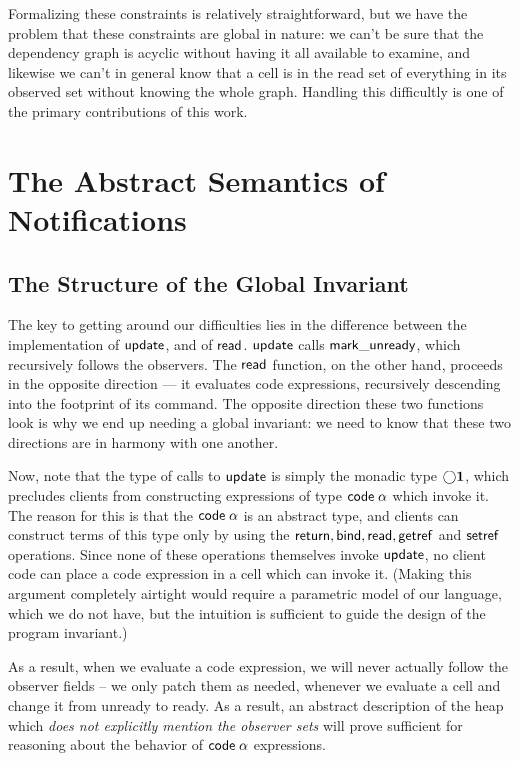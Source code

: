 Formalizing these constraints is relatively straightforward, but we
have the problem that these constraints are global in nature:
we can't be sure that the dependency graph is acyclic without having
it all available to examine, and likewise we can't in general know
that a cell is in the read set of everything in its observed set
without knowing the whole graph. Handling this difficultly is one of
the primary contributions of this work. 

\section{The Abstract Semantics of Notifications}

\subsection{The Structure of the Global Invariant}

The key to getting around our difficulties lies in the difference
between the implementation of $\mathsf{update}$, and of $\mathsf{read}$.
$\mathsf{update}$ calls $\mathsf{mark\_unready}$, which recursively follows
the observers. The $\mathsf{read}$ function, on the other hand,
proceeds in the opposite direction --- it evaluates code expressions,
recursively descending into the footprint of its command. The opposite
direction these two functions look is why we end up needing a global
invariant: we need to know that these two directions are in harmony
with one another.

Now, note that the type of calls to $\mathsf{update}$ is simply the
monadic type $\bigcirc{\mathbf{1}}$, which precludes clients from
constructing expressions of type $\mathsf{code}\;{\alpha}$ which invoke
it. The reason for this is that the $\mathsf{code}\;{\alpha}$ is an abstract
type, and clients can construct terms of this type only by using the
$\mathsf{return}, \mathsf{bind}, \mathsf{read}, \mathsf{getref}$ and
$\mathsf{setref}$ operations. Since none of these operations themselves
invoke $\mathsf{update}$, no client code can place a code expression in a
cell which can invoke it. (Making this argument completely airtight
would require a parametric model of our language, which we do not
have, but the intuition is sufficient to guide the design of the
program invariant.)

As a result, when we evaluate a code expression, we will never
actually follow the observer fields -- we only patch them as
needed, whenever we evaluate a cell and change it from unready to
ready.  As a result, an abstract description of the heap which
\emph{does not explicitly mention the observer sets} will prove
sufficient for reasoning about the behavior of $\mathsf{code}\;{\alpha}$
expressions.

